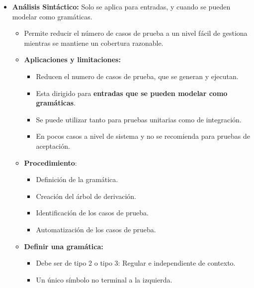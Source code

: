 \documentclass[12pt, twoside, openright]{report} %
\begin{document}
\begin{itemize}
\item
  \textbf{Análisis Sintáctico:} Solo se aplica para entradas, y cuando
  se pueden modelar como gramáticas.

  \begin{itemize}
  \item Permite reducir el número de casos de prueba a un nivel fácil de
    gestiona mientras se mantiene un cobertura razonable.
    
  \item \textbf{Aplicaciones y limitaciones:}
    

    \begin{itemize}
    \item Reducen el numero de casos de prueba, que se generan y ejecutan.
      
    \item Esta dirigido para \textbf{entradas que se pueden modelar como
      gramáticas}.
      
    \item Se puede utilizar tanto para pruebas unitarias como de
      integración.
      
    \item En pocos casos a nivel de sistema y no se recomienda para pruebas
      de aceptación.
      
    \end{itemize}
  \item \textbf{Procedimiento}:
    

    \begin{itemize}
    \item Definición de la gramática.
      
    \item Creación del árbol de derivación.
      
    \item Identificación de los casos de prueba.
      
    \item Automatización de los casos de prueba.
      
    \end{itemize}
  \item \textbf{Definir una gramática:}
    

    \begin{itemize}
    \item Debe ser de tipo 2 o tipo 3: Regular e independiente de contexto.
      
    \item Un único símbolo no terminal a la izquierda.
      

\end{itemize}
\end{itemize}
\end{itemize}
\end{document}
